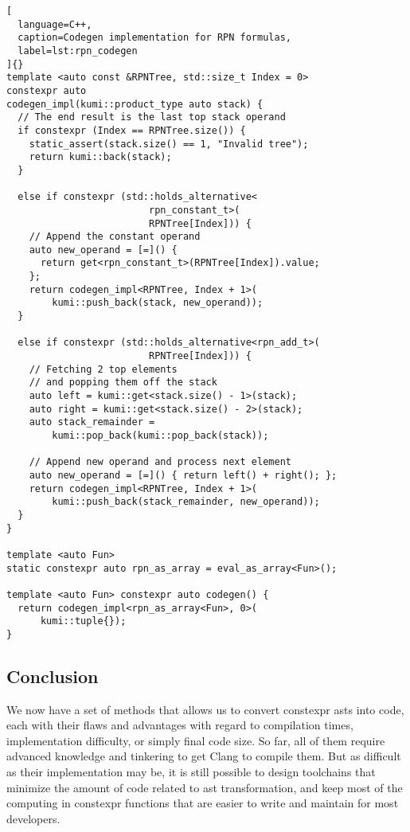 \documentclass[../main]{subfiles}
\begin{document}
\begin{lstlisting}[
  language=C++,
  caption=Codegen implementation for RPN formulas,
  label=lst:rpn_codegen
]{}
template <auto const &RPNTree, std::size_t Index = 0>
constexpr auto
codegen_impl(kumi::product_type auto stack) {
  // The end result is the last top stack operand
  if constexpr (Index == RPNTree.size()) {
    static_assert(stack.size() == 1, "Invalid tree");
    return kumi::back(stack);
  }

  else if constexpr (std::holds_alternative<
                         rpn_constant_t>(
                         RPNTree[Index])) {
    // Append the constant operand
    auto new_operand = [=]() {
      return get<rpn_constant_t>(RPNTree[Index]).value;
    };
    return codegen_impl<RPNTree, Index + 1>(
        kumi::push_back(stack, new_operand));
  }

  else if constexpr (std::holds_alternative<rpn_add_t>(
                         RPNTree[Index])) {
    // Fetching 2 top elements
    // and popping them off the stack
    auto left = kumi::get<stack.size() - 1>(stack);
    auto right = kumi::get<stack.size() - 2>(stack);
    auto stack_remainder =
        kumi::pop_back(kumi::pop_back(stack));

    // Append new operand and process next element
    auto new_operand = [=]() { return left() + right(); };
    return codegen_impl<RPNTree, Index + 1>(
        kumi::push_back(stack_remainder, new_operand));
  }
}

template <auto Fun>
static constexpr auto rpn_as_array = eval_as_array<Fun>();

template <auto Fun> constexpr auto codegen() {
  return codegen_impl<rpn_as_array<Fun>, 0>(
      kumi::tuple{});
}
\end{lstlisting}

\clearpage%

\subsection{
  Conclusion
}

We now have a set of methods that allows us to convert \gls{constexpr}
\glspl{ast} into \cpp code, each with their flaws and advantages with regard
to compilation times, implementation difficulty, or simply final code size.
So far, all of them require advanced \cpp knowledge and tinkering to get
Clang to compile them. But as difficult as their implementation may be,
it is still possible to design toolchains that minimize the amount of code
related to \gls{ast} transformation, and keep most of the computing in
\gls{constexpr} functions that are easier to write and maintain
for most \cpp developers.
\end{document}
